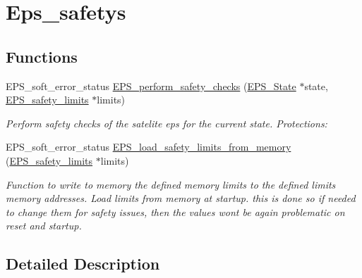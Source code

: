 \hypertarget{group__eps__safetys}{\section{Eps\-\_\-safetys}
\label{group__eps__safetys}
}
\subsection*{Functions}
\begin{DoxyCompactItemize}
\item 
E\-P\-S\-\_\-soft\-\_\-error\-\_\-status \hyperlink{group__eps__safetys_ga2867775c8dee462ce7a20867e8582df0}{E\-P\-S\-\_\-perform\-\_\-safety\-\_\-checks} (\hyperlink{struct_e_p_s___state}{E\-P\-S\-\_\-\-State} $\ast$state, \hyperlink{struct_e_p_s__safety__limits}{E\-P\-S\-\_\-safety\-\_\-limits} $\ast$limits)
\begin{DoxyCompactList}\small\item\em Perform safety checks of the satelite eps for the current state. Protections\-: \end{DoxyCompactList}\item 
E\-P\-S\-\_\-soft\-\_\-error\-\_\-status \hyperlink{group__eps__safetys_ga39c4acaac6d5e9818c1570ca02c2e015}{E\-P\-S\-\_\-load\-\_\-safety\-\_\-limits\-\_\-from\-\_\-memory} (\hyperlink{struct_e_p_s__safety__limits}{E\-P\-S\-\_\-safety\-\_\-limits} $\ast$limits)
\begin{DoxyCompactList}\small\item\em Function to write to memory the defined memory limits to the defined limits memory addresses. Load limits from memory at startup. this is done so if needed to change them for safety issues, then the values wont be again problematic on reset and startup. \end{DoxyCompactList}\end{DoxyCompactItemize}


\subsection{Detailed Description}


